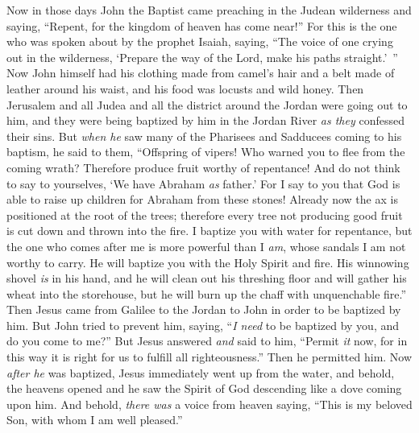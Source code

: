 \begin{biblechapter} %
 Now in those days John the Baptist came preaching in the Judean wilderness
\verse and saying, “Repent, for the kingdom of heaven has come near!”
\verse For this is the one who was spoken about by the prophet Isaiah, saying, “The voice of one crying out in the wilderness, 
‘Prepare the way of the Lord, 
make his paths straight.’ ”
\verse Now John himself had his clothing made from camel’s hair and a belt made of leather around his waist, and his food was locusts and wild honey.
\verse Then Jerusalem and all Judea and all the district around the Jordan were going out to him,
\verse and they were being baptized by him in the Jordan River \textit{as they} confessed their sins.
\verse But \textit{when he} saw many of the Pharisees and Sadducees coming to his baptism, he said to them, “Offspring of vipers! Who warned you to flee from the coming wrath?
\verse Therefore produce fruit worthy of repentance!
\verse And do not think to say to yourselves, ‘We have Abraham \textit{as} father.’ For I say to you that God is able to raise up children for Abraham from these stones!
\verse Already now the ax is positioned at the root of the trees; therefore every tree not producing good fruit is cut down and thrown into the fire.
\verse I baptize you with water for repentance, but the one who comes after me is more powerful than I \textit{am}, whose sandals I am not worthy to carry. He will baptize you with the Holy Spirit and fire.
\verse His winnowing shovel \textit{is} in his hand, and he will clean out his threshing floor and will gather his wheat into the storehouse, but he will burn up the chaff with unquenchable fire.”
 Then Jesus came from Galilee to the Jordan to John in order to be baptized by him.
\verse But John tried to prevent him, saying, “\textit{I need} to be baptized by you, and do you come to me?”
\verse But Jesus answered \textit{and} said to him, “Permit \textit{it} now, for in this way it is right for us to fulfill all righteousness.” Then he permitted him.
\verse Now \textit{after he} was baptized, Jesus immediately went up from the water, and behold, the heavens opened and he saw the Spirit of God descending like a dove coming upon him.
\verse And behold, \textit{there was} a voice from heaven saying, “This is my beloved Son, with whom I am well pleased.”
\end{biblechapter}

